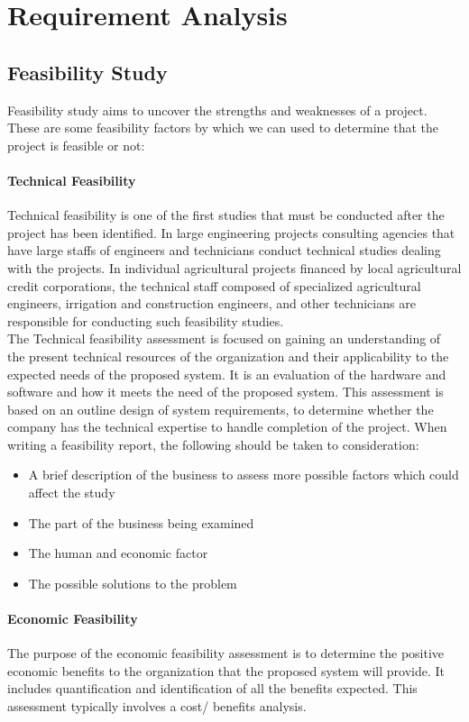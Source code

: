 \chapter{Requirement Analysis}

\section{Feasibility Study}
Feasibility study aims to uncover the strengths and weaknesses of
a project. These are some feasibility factors by which we can used to determine that the project is feasible or not:
    \subsubsection{Technical Feasibility}
Technical feasibility is one of the first studies that must be conducted after the project has been identified. In large engineering projects consulting agencies that have large staffs of engineers and technicians conduct technical studies dealing with the projects. In individual agricultural projects financed by local agricultural credit corporations, the technical staff composed of specialized agricultural engineers, irrigation and construction engineers, and other technicians are responsible for conducting such feasibility studies.\\ The Technical feasibility assessment is focused on gaining an understanding of the present technical resources of the organization and their applicability to the expected needs of the proposed system. It is an evaluation of the hardware and software and how it meets the need of the proposed system. This assessment is based on an outline design of system requirements, to determine whether the company has the technical expertise to handle completion of the project. When writing a feasibility report, the following should be taken to consideration:
\begin{itemize}
    \item A brief description of the business to assess more possible factors which could affect the study
    \item The part of the business being examined
    \item The human and economic factor
    \item The possible solutions to the problem
\end{itemize}
 \subsubsection{Economic Feasibility}
The purpose of the economic feasibility assessment is to determine the positive economic benefits to the organization that the proposed system will provide. It includes quantification and identification of all the benefits expected. This assessment typically involves a cost/ benefits analysis.\\

